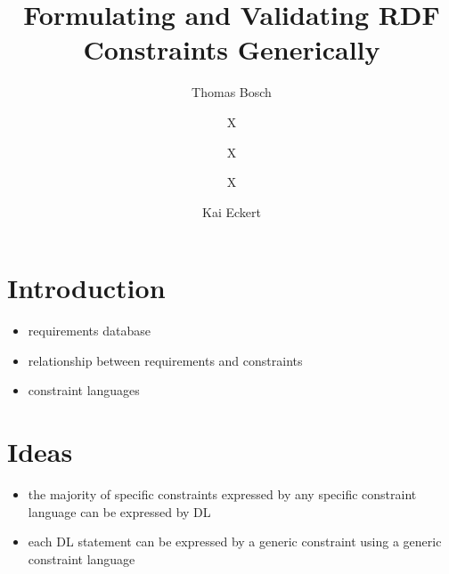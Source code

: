 \documentclass{llncs}
\begin{document}
%
%
\title{Formulating and Validating RDF Constraints Generically}
%
%
\author{Thomas Bosch \and X \and X \and X \and Kai Eckert}
%
%

\maketitle              %

\begin{abstract}


\end{abstract}
%


\section{Introduction}

\begin{itemize}
	\item requirements database
	\item relationship between requirements and constraints
	\item constraint languages
\end{itemize}

\section{Ideas}

\begin{itemize}
	\item the majority of specific constraints expressed by any specific constraint language can be expressed by DL
	\item each DL statement can be expressed by a generic constraint using a generic constraint language
\end{itemize}
\end{document}
